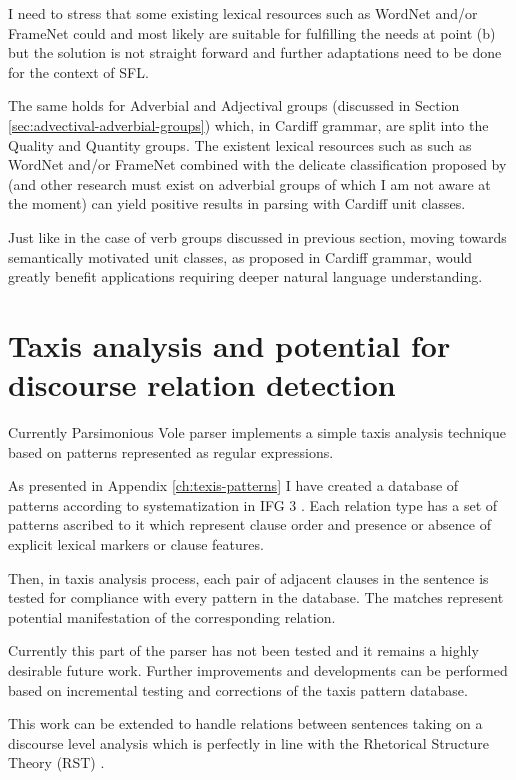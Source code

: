 I need to stress that some existing lexical resources such as WordNet \citep{Miller1995} and/or FrameNet\citep{Baker1998} could and most likely are suitable for fulfilling the needs at point (b) but the solution is not straight forward and further adaptations need to be done for the context of SFL.

The same holds for Adverbial and Adjectival groups (discussed in Section \ref{sec:advectival-adverbial-groups}) which, in Cardiff grammar, are split into the Quality and Quantity groups. The existent lexical resources such as such as WordNet \citep{Miller1995} and/or FrameNet\citep{Baker1998} combined with the delicate classification proposed by \citet{Tucker1997} (and other research must exist on adverbial groups of which I am not aware at the moment) can yield positive results in parsing with Cardiff unit classes. 

Just like in the case of verb groups discussed in previous section, moving towards semantically motivated unit classes, as proposed in Cardiff grammar, would greatly benefit applications requiring deeper natural language understanding.

\section{Taxis analysis and potential for discourse relation detection}
Currently Parsimonious Vole parser implements a simple taxis analysis technique based on patterns represented as regular expressions. 

As presented in Appendix \ref{ch:texis-patterns} I have created a database of patterns according to systematization in IFG 3 \citep{Halliday2004}. Each relation type has a set of patterns ascribed to it which represent clause order and presence or absence of explicit lexical markers or clause features. 

Then, in taxis analysis process, each pair of adjacent clauses in the sentence is tested for compliance with every pattern in the database. The matches represent potential manifestation of the corresponding relation.  

Currently this part of the parser has not been tested and it remains a highly desirable future work. Further improvements and developments can be performed based on incremental testing and corrections of the taxis pattern database.

This work can be extended to handle relations between sentences taking on a discourse level analysis which is perfectly in line with the Rhetorical Structure Theory (RST) \citep{Mann1988,Mann1992}. 

